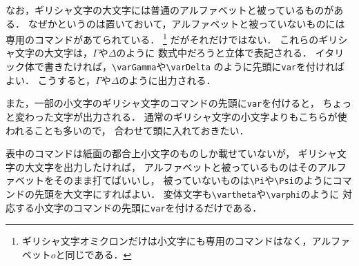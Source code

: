 なお，ギリシャ文字の大文字には普通のアルファベットと被っているものがある．
なぜかというのは置いておいて，アルファベットと被っていないものには
専用のコマンドがあてられている．
\footnote{ギリシャ文字オミクロンだけは小文字にも専用のコマンドはなく，アルファベット$o$と同じである．}
だがそれだけではない．
これらのギリシャ文字の大文字は，$\Gamma$や$\Delta$のように
数式中だろうと立体で表記される．
イタリック体で書きたければ，\verb|\varGamma|や\verb|\varDelta|
のように先頭に\verb|var|を付ければよい．
こうすると，$\varGamma$や$\varDelta$のように出力される．

また，一部の小文字のギリシャ文字のコマンドの先頭に\verb|var|を付けると，
ちょっと変わった文字が出力される．
通常のギリシャ文字の小文字よりもこちらが使われることも多いので，
合わせて頭に入れておきたい．

表中のコマンドは紙面の都合上小文字のものしか載せていないが，
ギリシャ文字の大文字を出力したければ，
アルファベットと被っているものはそのアルファベットをそのまま打てばいいし，
被っていないものは\verb|\Pi|や\verb|\Psi|のようにコマンドの先頭を大文字にすればよい．
変体文字も\verb|\vartheta|や\verb|\varphi|のように
対応する小文字のコマンドの先頭に\verb|var|を付けるだけである．

